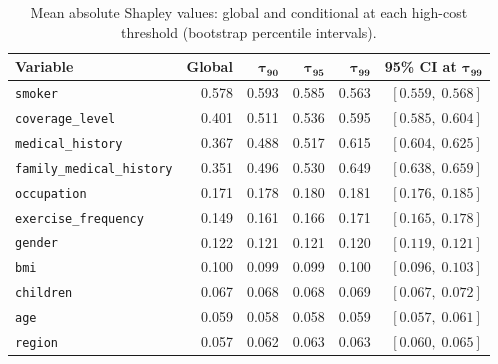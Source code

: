 \begin{table}[H]
\centering
\small
\renewcommand{\arraystretch}{1.15}
\begin{tabular}{lrrrrr}
\toprule
\textbf{Variable} & \textbf{Global} & $\boldsymbol{\tau_{90}}$ &
$\boldsymbol{\tau_{95}}$ & $\boldsymbol{\tau_{99}}$ &
\textbf{95\% CI at $\boldsymbol{\tau_{99}}$} \\
\midrule
\texttt{smoker} & 0.578 & 0.593 & 0.585 & 0.563 & $[0.559,\; 0.568]$ \\
\texttt{coverage\_\allowbreak{}level} & 0.401 & 0.511 & 0.536 & 0.595 & $[0.585,\; 0.604]$ \\
\texttt{medical\_\allowbreak{}history} & 0.367 & 0.488 & 0.517 & 0.615 & $[0.604,\; 0.625]$ \\
\texttt{family\_medical\_\allowbreak{}history} & 0.351 & 0.496 & 0.530 & 0.649 & $[0.638,\; 0.659]$ \\
\texttt{occupation} & 0.171 & 0.178 & 0.180 & 0.181 & $[0.176,\; 0.185]$ \\
\texttt{exercise\_\allowbreak{}frequency} & 0.149 & 0.161 & 0.166 & 0.171 & $[0.165,\; 0.178]$ \\
\texttt{gender} & 0.122 & 0.121 & 0.121 & 0.120 & $[0.119,\; 0.121]$ \\
\texttt{bmi} & 0.100 & 0.099 & 0.099 & 0.100 & $[0.096,\; 0.103]$ \\
\texttt{children} & 0.067 & 0.068 & 0.068 & 0.069 & $[0.067,\; 0.072]$ \\
\texttt{age} & 0.059 & 0.058 & 0.058 & 0.059 & $[0.057,\; 0.061]$ \\
\texttt{region} & 0.057 & 0.062 & 0.063 & 0.063 & $[0.060,\; 0.065]$ \\
\bottomrule
\end{tabular}
\caption{Mean absolute Shapley values: global and conditional at each
high-cost threshold (bootstrap percentile intervals).}
\label{tab:shap_conditional_values_ch4}
\end{table}

